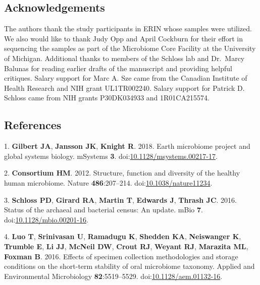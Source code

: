 \documentclass[11pt,]{article}
\begin{document}
\newpage

\hypertarget{acknowledgements}{%
\subsection{Acknowledgements}\label{acknowledgements}}

The authors thank the study participants in ERIN whose samples were
utilized. We also would like to thank Judy Opp and April Cockburn for
their effort in sequencing the samples as part of the Microbiome Core
Facility at the University of Michigan. Additional thanks to members of
the Schloss lab and Dr.~Marcy Balunas for reading earlier drafts of the
manuscript and providing helpful critiques. Salary support for Marc A.
Sze came from the Canadian Institute of Health Research and NIH grant
UL1TR002240. Salary support for Patrick D. Schloss came from NIH grants
P30DK034933 and 1R01CA215574.

\newpage

\hypertarget{references}{%
\subsection{References}\label{references}}

\hypertarget{refs}{}
\leavevmode\hypertarget{ref-Gilbert2018}{}%
1. \textbf{Gilbert JA}, \textbf{Jansson JK}, \textbf{Knight R}. 2018.
Earth microbiome project and global systems biology. mSystems
\textbf{3}.
doi:\href{https://doi.org/10.1128/msystems.00217-17}{10.1128/msystems.00217-17}.

\leavevmode\hypertarget{ref-HMP2012}{}%
2. \textbf{Consortium HM}. 2012. Structure, function and diversity of
the healthy human microbiome. Nature \textbf{486}:207--214.
doi:\href{https://doi.org/10.1038/nature11234}{10.1038/nature11234}.

\leavevmode\hypertarget{ref-Schloss2016}{}%
3. \textbf{Schloss PD}, \textbf{Girard RA}, \textbf{Martin T},
\textbf{Edwards J}, \textbf{Thrash JC}. 2016. Status of the archaeal and
bacterial census: An update. mBio \textbf{7}.
doi:\href{https://doi.org/10.1128/mbio.00201-16}{10.1128/mbio.00201-16}.

\leavevmode\hypertarget{ref-Luo2016}{}%
4. \textbf{Luo T}, \textbf{Srinivasan U}, \textbf{Ramadugu K},
\textbf{Shedden KA}, \textbf{Neiswanger K}, \textbf{Trumble E},
\textbf{Li JJ}, \textbf{McNeil DW}, \textbf{Crout RJ}, \textbf{Weyant
RJ}, \textbf{Marazita ML}, \textbf{Foxman B}. 2016. Effects of specimen
collection methodologies and storage conditions on the short-term
stability of oral microbiome taxonomy. Applied and Environmental
Microbiology \textbf{82}:5519--5529.
doi:\href{https://doi.org/10.1128/aem.01132-16}{10.1128/aem.01132-16}.
\end{document}
